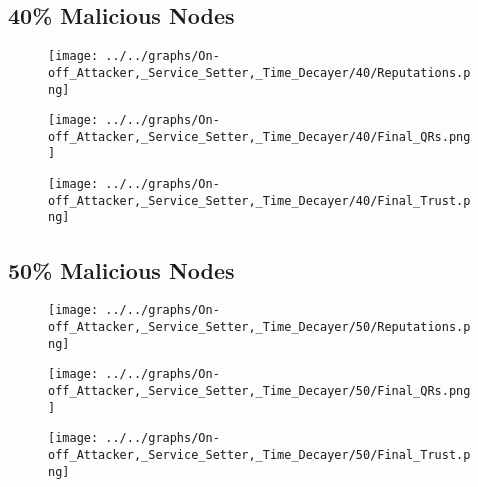 \begin{minipage}[t]{0.49\columnwidth}
\subsection*{40\% Malicious Nodes}
    \begin{figure}[H]
        \centering
        \texttt{[image: ../../graphs/On-off\_Attacker,\_Service\_Setter,\_Time\_Decayer/40/Reputations.png]}
    \end{figure}
    \begin{figure}[H]
        \centering
        \texttt{[image: ../../graphs/On-off\_Attacker,\_Service\_Setter,\_Time\_Decayer/40/Final\_QRs.png]}
    \end{figure}
\end{minipage}
\begin{minipage}[t]{0.49\columnwidth}
    \begin{figure}[H]
        \centering
        \texttt{[image: ../../graphs/On-off\_Attacker,\_Service\_Setter,\_Time\_Decayer/40/Final\_Trust.png]}
    \end{figure}
\end{minipage}

\begin{minipage}[t]{0.49\columnwidth}
\subsection*{50\% Malicious Nodes}
    \begin{figure}[H]
        \centering
        \texttt{[image: ../../graphs/On-off\_Attacker,\_Service\_Setter,\_Time\_Decayer/50/Reputations.png]}
    \end{figure}
    \begin{figure}[H]
        \centering
        \texttt{[image: ../../graphs/On-off\_Attacker,\_Service\_Setter,\_Time\_Decayer/50/Final\_QRs.png]}
    \end{figure}
\end{minipage}
\begin{minipage}[t]{0.49\columnwidth}
    \begin{figure}[H]
        \centering
        \texttt{[image: ../../graphs/On-off\_Attacker,\_Service\_Setter,\_Time\_Decayer/50/Final\_Trust.png]}
    \end{figure}
\end{minipage}

